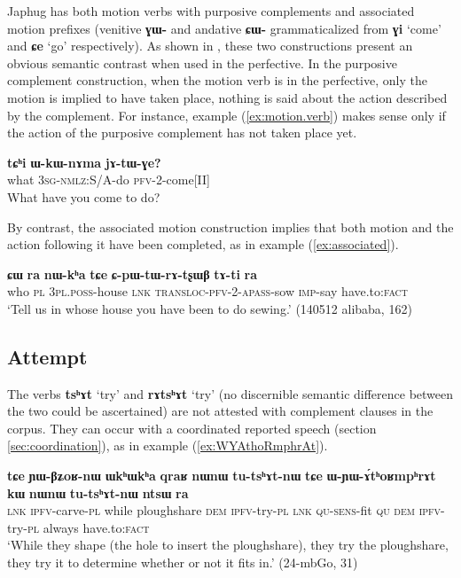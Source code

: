 \documentclass[oneside,a4paper,11pt]{article}
\newcommand{\ipa}[1]{\textbf{\phon#1}} %
\newcommand{\jpg}[2]{\ipa{#1} `#2'} %
\newcommand{\refb}[1]{(\ref{#1})}
\begin{document}
Japhug has both motion verbs with purposive complements and associated motion  prefixes (venitive \ipa{ɣɯ-}  and andative \ipa{ɕɯ-} grammaticalized from \jpg{ɣi}{come} and  \jpg{ɕe}{go} respectively). As shown in \citet[203]{jacques13harmonization}, these two constructions present an obvious semantic contrast when used in the perfective. In the purposive complement construction, when the motion verb is in the perfective, only the motion is implied to have taken place, nothing is said about the action described by the  complement. For instance, example \refb{ex:motion.verb} makes sense only if the action of the purposive complement has not taken place yet.

\begin{exe}
\ex \label{ex:motion.verb}
\gll
\ipa{tɕʰi} 	\ipa{ɯ-kɯ-nɤma} 	\ipa{jɤ-tɯ-ɣe?} \\
what \textsc{3sg-nmlz:}S/A-do \textsc{pfv-2}-come[II] \\
\glt What have you come to do?
\end{exe} 

By contrast, the associated motion construction implies that both motion and the action following it have been completed, as in example \refb{ex:associated}.

\begin{exe}
\ex \label{ex:associated}
\gll
\ipa{ɕɯ} 	\ipa{ra} 	\ipa{nɯ-kʰa} 	\ipa{tɕe} 	\ipa{ɕ-pɯ-tɯ-rɤ-tʂɯβ} \ipa{tɤ-ti} \ipa{ra}\\
who \textsc{pl} \textsc{3pl.poss}-house \textsc{lnk} \textsc{transloc-pfv-2-apass}-sow \textsc{imp}-say  have.to:\textsc{fact} \\
\glt `Tell us in whose house you have been to do sewing.' (140512 alibaba, 162)
 \end{exe} 

\subsection{Attempt} \label{sec:attempt}
The verbs \jpg{tsʰɤt}{try} and \jpg{rɤtsʰɤt}{try} (no discernible semantic difference between the two could be ascertained) are not attested with complement clauses in the corpus. They can occur with a coordinated reported speech (section \ref{sec:coordination}), as in example \refb{ex:WYAthoRmphrAt}.
 
\begin{exe}
\ex \label{ex:WYAthoRmphrAt}
\gll \ipa{tɕe} 	\ipa{ɲɯ-βʑoʁ-nɯ} 	\ipa{ɯkʰɯkʰa} 	\ipa{qraʁ} 	\ipa{nɯnɯ} 	\ipa{tu-tsʰɤt-nɯ} 	\ipa{tɕe} 	\ipa{ɯ-ɲɯ-ɤ́tʰoʁmpʰrɤt} 	\ipa{kɯ} 	\ipa{nɯnɯ} 	\ipa{tu-tsʰɤt-nɯ} 	\ipa{ntsɯ} 	\ipa{ra}   	 \\
\textsc{lnk} \textsc{ipfv}-carve-\textsc{pl} while ploughshare \textsc{dem} \textsc{ipfv}-try-\textsc{pl} \textsc{lnk} \textsc{qu-sens}-fit \textsc{qu} \textsc{dem} \textsc{ipfv}-try-\textsc{pl} always have.to:\textsc{fact} \\
 \glt `While they shape (the hole to insert the ploughshare), they try the ploughshare, they try it to determine whether or not it fits in.' (24-mbGo, 31)
\end{exe}
\end{document}

